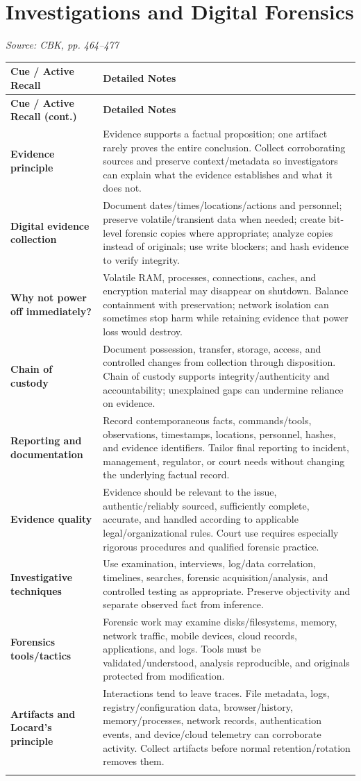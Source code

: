\documentclass[10pt,letterpaper]{article}
\makeatletter
\newenvironment{cornell}{\rowcolors{2}{white}{notebg}\begin{longtable}{@{}>{\raggedright\arraybackslash\columncolor{cuebg}\color{navy}\bfseries}p{0.285\textwidth}>{\raggedright\arraybackslash}p{0.65\textwidth}@{}}\rowcolor{navy}\color{white}\textbf{Cue / Active Recall} & \color{white}\textbf{Detailed Notes}\\ \hline\endfirsthead\rowcolor{navy}\color{white}\textbf{Cue / Active Recall (cont.)} & \color{white}\textbf{Detailed Notes}\\ \hline\endhead}{\end{longtable}}
\newcommand{\noterow}[2]{#1 & #2\\\arrayrulecolor{line}\hline}\newcommand{\source}[1]{\par{\footnotesize\color{teal}\textit{Source: CBK, #1}}\par}
\makeatother
\begin{document}
\section{\color{navy}Investigations and Digital Forensics}
\source{pp. 464--477}
\begin{cornell}
\noterow{Evidence principle}{Evidence supports a factual proposition; one artifact rarely proves the entire conclusion. Collect corroborating sources and preserve context/metadata so investigators can explain what the evidence establishes and what it does not.}
\noterow{Digital evidence collection}{Document dates/times/locations/actions and personnel; preserve volatile/transient data when needed; create bit-level forensic copies where appropriate; analyze copies instead of originals; use write blockers; and hash evidence to verify integrity.}
\noterow{Why not power off immediately?}{Volatile RAM, processes, connections, caches, and encryption material may disappear on shutdown. Balance containment with preservation; network isolation can sometimes stop harm while retaining evidence that power loss would destroy.}
\noterow{Chain of custody}{Document possession, transfer, storage, access, and controlled changes from collection through disposition. Chain of custody supports integrity/authenticity and accountability; unexplained gaps can undermine reliance on evidence.}
\noterow{Reporting and documentation}{Record contemporaneous facts, commands/tools, observations, timestamps, locations, personnel, hashes, and evidence identifiers. Tailor final reporting to incident, management, regulator, or court needs without changing the underlying factual record.}
\noterow{Evidence quality}{Evidence should be relevant to the issue, authentic/reliably sourced, sufficiently complete, accurate, and handled according to applicable legal/organizational rules. Court use requires especially rigorous procedures and qualified forensic practice.}
\noterow{Investigative techniques}{Use examination, interviews, log/data correlation, timelines, searches, forensic acquisition/analysis, and controlled testing as appropriate. Preserve objectivity and separate observed fact from inference.}
\noterow{Forensics tools/tactics}{Forensic work may examine disks/filesystems, memory, network traffic, mobile devices, cloud records, applications, and logs. Tools must be validated/understood, analysis reproducible, and originals protected from modification.}
\noterow{Artifacts and Locard's principle}{Interactions tend to leave traces. File metadata, logs, registry/configuration data, browser/history, memory/processes, network records, authentication events, and device/cloud telemetry can corroborate activity. Collect artifacts before normal retention/rotation removes them.}
\end{cornell}
\end{document}

